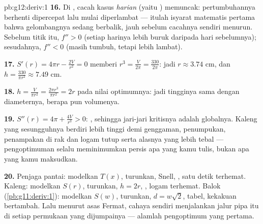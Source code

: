 \begin{solution}{pb:g12:deriv:1}
\textbf{16.} Di , cacah kasus \emph{harian}
(yaitu ) memuncak: pertumbuhannya berhenti dipercepat lalu mulai
diperlambat --- itulah isyarat matematis pertama bahwa gelombangnya
sedang berbalik, jauh sebelum cacahnya sendiri menurun. Sebelum titik itu,
$f'' > 0$ (setiap harinya lebih buruk daripada hari sebelumnya); sesudahnya,
$f'' < 0$ (masih tumbuh, tetapi lebih lambat).

\textbf{17.} $S'(r) = 4\pi r - \frac{2V}{r^2} = 0$ memberi
$r^3 = \frac{V}{2\pi} = \frac{330}{2\pi}$:
jadi $r \approx 3.74$ cm, dan
$h = \frac{330}{\pi r^2} \approx 7.49$ cm.

\textbf{18.} $h = \frac{V}{\pi r^2} = \frac{2\pi r^3}{\pi r^2}
= 2r$ pada nilai optimumnya: jadi tingginya sama dengan diameternya,
berapa pun volumenya.

\textbf{19.} $S''(r) = 4\pi + \frac{4V}{r^3} > 0$: , sehingga
jari-jari kritisnya adalah  globalnya. Kaleng yang sesungguhnya
berdiri lebih tinggi demi genggaman, penumpukan, penampakan di rak dan
logam tutup serta alasnya yang lebih tebal --- pengoptimuman selalu
meminimumkan persis apa yang kamu tulis, bukan apa yang kamu maksudkan.

\textbf{20.} Penjaga pantai: modelkan $T(x)$, turunkan, Snell,
, satu detik terhemat. Kaleng: modelkan $S(r)$, turunkan,
$h = 2r$, , logam terhemat. Balok
(\cref{pb:g11:deriv:1}): modelkan $S(w)$, turunkan,
$d = w\sqrt2$, tabel, kekakuan bertambah. Lalu menurut asas
Fermat, cahaya sendiri menjalankan jalur pipa itu di setiap permukaan yang
dijumpainya --- alamlah pengoptimum yang pertama.

\end{solution}
